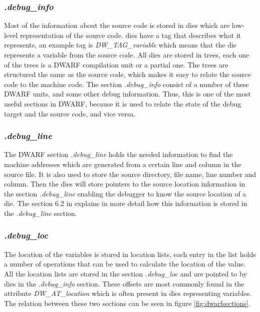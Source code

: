 \subsubsection{\emph{.debug\_info}}
Most of the information about the source code is stored in \glspl{die} which are low-level representation of the source code.
\glspl{die} have a tag that describes what it represents, an example tag is \emph{DW\_TAG\_variable} which means that the \gls{die} represents a variable from the source code.
All \glspl{die} are stored in trees, each one of the trees is a \gls{DWARF} compilation unit or a partial one.
The trees are structured the same as the source code, which makes it easy to relate the source code to the machine code.
The section \emph{.debug\_info} consist of a number of these \gls{DWARF} units, and some other debug information.
Thus, this is one of the most useful sections in \gls{DWARF}, because it is used to relate the state of the debug target and the source code, and vice versa.


\subsubsection{\emph{.debug\_line}}
The \gls{DWARF} section \emph{.debug\_line} holds the needed information to find the machine addresses which are generated from a certain line and column in the source file.
It is also used to store the source directory, file name, line number and column.
Then the \glspl{die} will store pointers to the source location information in the section \emph{.debug\_line} enabling the debugger to know the source location of a \gls{die}.
The section $6.2$ in \cite{dwarf} explains in more detail how this information is stored in the \emph{.debug\_line} section.


\subsubsection{\emph{.debug\_loc}}
The location of the variables is stored in location lists, each entry in the list holds a number of operations that can be used to calculate the location of the value.
All the location lists are stored in the section \emph{.debug\_loc} and are pointed to by \glspl{die} in the \emph{.debug\_info} section.
These offsets are most commonly found in the attribute \emph{DW\_AT\_location} which is often present in \glspl{die} representing variables.
The relation between these two sections can be seen in figure \ref{fig:dwarfsections}.



